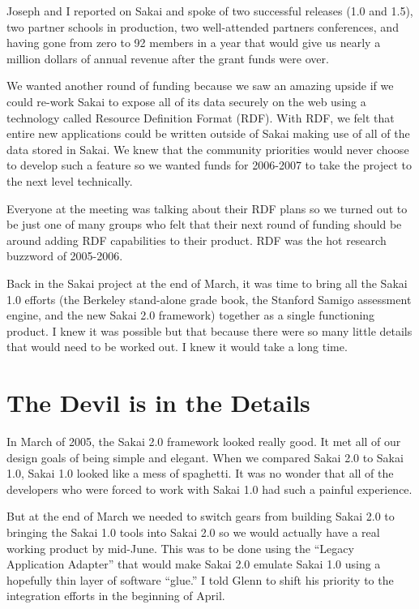 \documentclass[12pt]{book}
\begin{document}
Joseph and I reported on Sakai and spoke of two successful
releases (1.0 and 1.5), two partner schools in production,
two well-attended partners conferences, and having gone
from zero to 92 members in a year that would give us nearly
a million dollars of annual revenue after the grant funds
were over.

We wanted another round of funding because we saw an
amazing upside if we could re-work Sakai to expose all of
its data securely on the web using a technology called
Resource Definition Format (RDF).  With RDF, we felt that
entire new applications could be written outside of Sakai
making use of all of the data stored in Sakai.   We knew
that the community priorities would never choose to develop
such a feature so we wanted funds for 2006-2007 to take the
project to the next level technically.

Everyone at the meeting was talking about their RDF plans
so we turned out to be just one of many groups who felt
that their next round of funding should be around adding RDF
capabilities to their product.  RDF was the hot research
buzzword of 2005-2006.

Back in the Sakai project at the end of March, it was time
to bring all the Sakai 1.0 efforts (the Berkeley stand-alone grade book,
the Stanford Samigo assessment engine, and the new Sakai 2.0
framework) together as a single functioning product.
I knew it was possible but that because there were so many little
details that would need to be worked out.  I knew it would take
a long time.

\chapter{The Devil is in the Details}

In March of 2005, the Sakai 2.0 framework looked really good.
It met all of our design goals of being simple and elegant.
When we compared Sakai 2.0 to Sakai 1.0, Sakai 1.0 looked
like a mess of spaghetti.  It was no wonder that all
of the developers who were forced to work with Sakai 1.0
had such a painful experience.

But at the end of March we needed to switch gears from
building Sakai 2.0 to bringing the Sakai 1.0 tools
into Sakai 2.0 so we would actually have a real working product
by mid-June.  This was to be done using the ``Legacy
Application Adapter'' that would make Sakai 2.0 emulate
Sakai 1.0 using a hopefully thin layer of
software ``glue.''  I told Glenn to shift his priority
to the integration efforts in the beginning of April.
\end{document}
